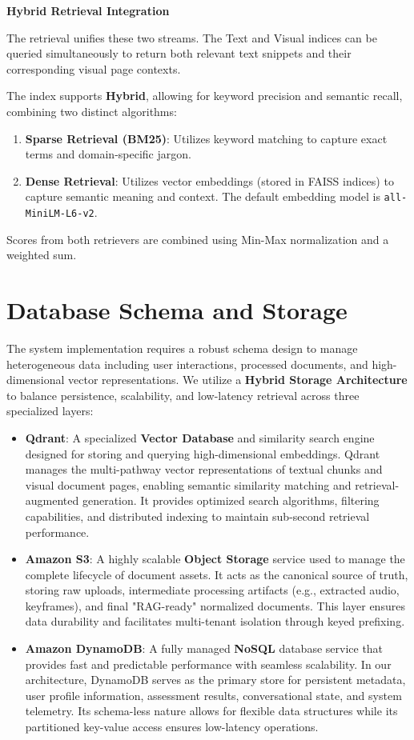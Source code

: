 \textbf{Hybrid Retrieval Integration}

The retrieval unifies these two streams. 
The Text and Visual indices can be queried simultaneously to return both relevant text snippets and their corresponding visual page contexts.

The index supports \textbf{Hybrid}, allowing for keyword precision and semantic recall, combining two distinct algorithms:

\begin{enumerate}
    \item \textbf{Sparse Retrieval (BM25)}: Utilizes keyword matching to capture exact terms and domain-specific jargon.
    \item \textbf{Dense Retrieval}: Utilizes vector embeddings (stored in FAISS indices) to capture semantic meaning and context. The default embedding model is \texttt{all-MiniLM-L6-v2}.
\end{enumerate}

Scores from both retrievers are combined using Min-Max normalization and a weighted sum.



\section{Database Schema and Storage}
The system implementation requires a robust schema design to manage heterogeneous data including user interactions, processed documents, and high-dimensional vector representations. We utilize a \textbf{Hybrid Storage Architecture} to balance persistence, scalability, and low-latency retrieval across three specialized layers:

\begin{itemize}
    \item \textbf{Qdrant}: A specialized \textbf{Vector Database} and similarity search engine designed for storing and querying high-dimensional embeddings. Qdrant manages the multi-pathway vector representations of textual chunks and visual document pages, enabling semantic similarity matching and retrieval-augmented generation. It provides optimized search algorithms, filtering capabilities, and distributed indexing to maintain sub-second retrieval performance.
    \item \textbf{Amazon S3}: A highly scalable \textbf{Object Storage} service used to manage the complete lifecycle of document assets. It acts as the canonical source of truth, storing raw uploads, intermediate processing artifacts (e.g., extracted audio, keyframes), and final "RAG-ready" normalized documents. This layer ensures data durability and facilitates multi-tenant isolation through keyed prefixing.
    \item \textbf{Amazon DynamoDB}: A fully managed \textbf{NoSQL} database service that provides fast and predictable performance with seamless scalability. In our architecture, DynamoDB serves as the primary store for persistent metadata, user profile information, assessment results, conversational state, and system telemetry. Its schema-less nature allows for flexible data structures while its partitioned key-value access ensures low-latency operations.
\end{itemize}

